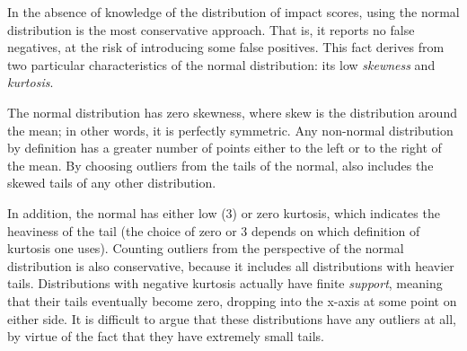 In the absence of knowledge of the distribution of impact scores, using
the normal distribution is the most conservative approach. That is, it
reports no false negatives, at the risk of introducing some false
positives. This fact derives from two particular characteristics of the
normal distribution: its low \emph{skewness} and \emph{kurtosis}.

The normal distribution has zero skewness, where skew is the
distribution around the mean; in other words, it is perfectly
symmetric. Any non-normal distribution by definition has a greater
number of points either to the left or to the right of the mean. By
choosing outliers from the tails of the normal, \checkcell{} also
includes the skewed tails of any other distribution.

In addition, the normal has either low (3) or zero kurtosis, which
indicates the heaviness of the tail (the choice of zero or 3 depends
on which definition of kurtosis one uses). Counting outliers from the
perspective of the normal distribution is also conservative, because
it includes all distributions with heavier tails. Distributions with
negative kurtosis actually have finite \emph{support}, meaning that
their tails eventually become zero, dropping into the x-axis at some
point on either side. It is difficult to argue that these
distributions have any outliers at all, by virtue of the fact that
they have extremely small tails.

